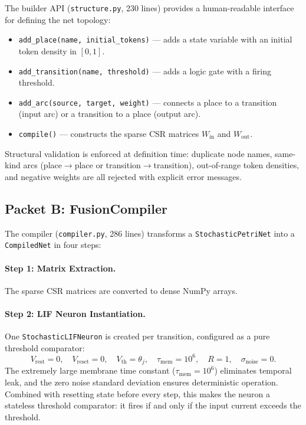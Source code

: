 \documentclass[12pt]{article}
\newcommand{\code}[1]{\texttt{#1}}
\begin{document}
The builder API (\code{structure.py}, 230 lines) provides a
human-readable interface for defining the net topology:
\begin{itemize}
  \item \code{add\_place(name, initial\_tokens)} --- adds a state
    variable with an initial token density in $[0,1]$.
  \item \code{add\_transition(name, threshold)} --- adds a logic gate
    with a firing threshold.
  \item \code{add\_arc(source, target, weight)} --- connects a place to
    a transition (input arc) or a transition to a place (output arc).
  \item \code{compile()} --- constructs the sparse CSR matrices
    $W_{\mathrm{in}}$ and $W_{\mathrm{out}}$.
\end{itemize}

Structural validation is enforced at definition time: duplicate node
names, same-kind arcs (place$\to$place or transition$\to$transition),
out-of-range token densities, and negative weights are all rejected with
explicit error messages.

\subsection{Packet B: FusionCompiler}

The compiler (\code{compiler.py}, 286 lines) transforms a
\code{StochasticPetriNet} into a \code{CompiledNet} in four steps:

\paragraph{Step 1: Matrix Extraction.}
The sparse CSR matrices are converted to dense NumPy arrays.

\paragraph{Step 2: LIF Neuron Instantiation.}
One \code{StochasticLIFNeuron} is created per transition, configured as
a pure threshold comparator:
\begin{equation}
  V_{\text{rest}} = 0, \quad
  V_{\text{reset}} = 0, \quad
  V_{\text{th}} = \theta_j, \quad
  \tau_{\text{mem}} = 10^6, \quad
  R = 1, \quad
  \sigma_{\text{noise}} = 0.
  \label{eq:lif-config}
\end{equation}
The extremely large membrane time constant ($\tau_{\text{mem}} = 10^6$)
eliminates temporal leak, and the zero noise standard deviation ensures
deterministic operation.  Combined with resetting state before every
step, this makes the neuron a stateless threshold comparator: it fires
if and only if the input current exceeds the threshold.
\end{document}
